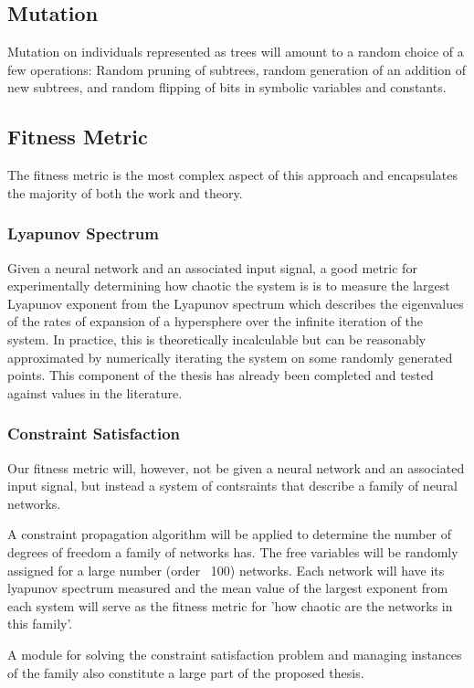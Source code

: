 \documentclass[12pt]{article}
\begin{document}
\subsection{Mutation}
Mutation on individuals represented as trees will amount to a random choice of 
a few operations:  Random pruning of subtrees, random generation of an 
addition of new subtrees, and random flipping of bits in symbolic variables 
and constants.

\subsection{Fitness Metric}
The fitness metric is the most complex aspect of this approach and encapsulates
the majority of both the work and theory.

\subsubsection{Lyapunov Spectrum}
Given a neural network and an associated input signal, a good metric for
experimentally determining how chaotic the system is is to measure the
largest Lyapunov exponent from the Lyapunov spectrum which describes the
eigenvalues of the rates of expansion of a hypersphere over the infinite
iteration of the system.  In practice, this is theoretically incalculable but
can be reasonably approximated by numerically iterating the system on 
some randomly generated points\cite{sprott}.  This component of the thesis
has already been completed and tested against values in the literature.

\subsubsection{Constraint Satisfaction}
Our fitness metric will, however, not be given a neural network and an 
associated input signal, but instead a system of contsraints that describe
a family of neural networks.

A constraint propagation algorithm \cite{norvig}  will be applied to
determine the number of degrees of freedom a family of networks has.
The free variables will be randomly assigned for a large number (order ~100)
networks.  Each network will have its lyapunov spectrum measured and the mean
value of the largest exponent from each system will serve as the fitness metric
for 'how chaotic are the networks in this family'.

A module for solving the constraint satisfaction problem and managing instances
of the family also constitute a large part of the proposed thesis.
\end{document}
